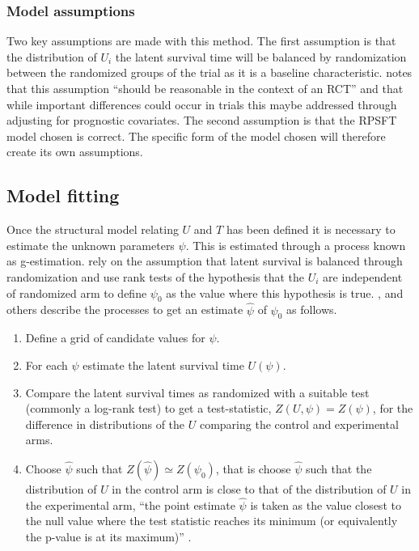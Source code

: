 \subsubsection{Model assumptions}
Two key assumptions are made with this method. The first assumption is that the distribution of $U_i$ the latent survival time will be balanced by randomization between the randomized groups of the trial as it is a baseline characteristic. \cite{TSD16} notes that this assumption ``should be reasonable in the context of an RCT'' and that while important differences could occur in trials this maybe addressed through adjusting for prognostic covariates. The second assumption is that the RPSFT model chosen is correct. The specific form of the model chosen will therefore create its own assumptions.



\subsection{Model fitting}
Once the structural model relating $U$ and $T$ has been defined it is necessary to estimate the unknown parameters $\psi$. This is estimated through a process known as g-estimation. \cite{Robins1991} rely on the assumption that latent survival is balanced through randomization and use rank tests of the hypothesis that the $U_i$ are independent of randomized arm to define $\psi_0$ as the value where this hypothesis is true. \cite{KorhonenATBC}, \cite{White1999} and others describe the processes to get an estimate $\hat{\psi}$ of $\psi_0$ as follows.

\begin{enumerate}
\item Define a grid of candidate values for $\psi$.
\item For each $\psi$ estimate the latent survival time $U(\psi)$.
\item Compare the latent survival times as randomized with a suitable test (commonly a log-rank test) to get a test-statistic, $Z(U,\psi) = Z(\psi)$, for the difference in distributions of the $U$ comparing the control and experimental arms.
\item Choose $\hat{\psi}$ such that $Z(\hat{\psi}) \simeq Z(\psi_0)$, that is choose $\hat{\psi}$ such that the distribution of $U$ in the control arm is close to that of the distribution of $U$ in the experimental arm, ``the point estimate $\hat{\psi}$ is taken as the value closest to the null value where the test statistic reaches its minimum (or equivalently the p-value is at its maximum)'' \citep{KorhonenRECORD}. 
\end{enumerate}

